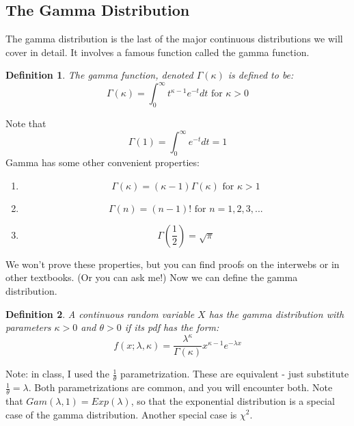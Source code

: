 \documentclass[12pt]{article} %
\newtheorem{defn}{Definition}
\begin{document}
\subsection{The Gamma Distribution}
The gamma distribution is the last of the major continuous distributions we will cover in detail. It involves a famous function called the gamma function.
\begin{defn}
The gamma function, denoted $\Gamma(\kappa)$ is defined to be:
$$\Gamma(\kappa) = \int_0^{\infty} t^{\kappa -1} e^{-t} dt \textrm{ for } \kappa >0$$
\end{defn}
Note that 
$$\Gamma(1)= \int_0^\infty e^{-t} dt = 1$$
Gamma has some other convenient properties:
\begin{enumerate}
\item $$\Gamma(\kappa) = (\kappa-1)\Gamma(\kappa) \textrm{ for } \kappa >1$$
\item $$\Gamma(n) = (n-1)! \textrm{ for } n=1,2,3,...$$
\item $$\Gamma(\frac12) = \sqrt{\pi}$$
\end{enumerate}
We won't prove these properties, but you can find proofs on the interwebs or in other textbooks. (Or you can ask me!) Now we can define the gamma distribution.
\begin{defn}
A continuous random variable $X$ has the gamma distribution with parameters $\kappa>0$ and $\theta>0$ if its pdf has the form:
$$f(x;\lambda,\kappa) = \frac{\lambda^\kappa} {\Gamma(\kappa)}x^{\kappa-1} e^{-\lambda x}$$
\end{defn}
Note: in class, I used the $\frac1\theta$ parametrization. These are equivalent - just substitute $\frac1\theta = \lambda$. Both parametrizations are common, and you will encounter both.
Note that $Gam(\lambda, 1) = Exp(\lambda)$, so that the exponential distribution is a special case of the gamma distribution. Another special case is $\chi^2$.
\end{document}
